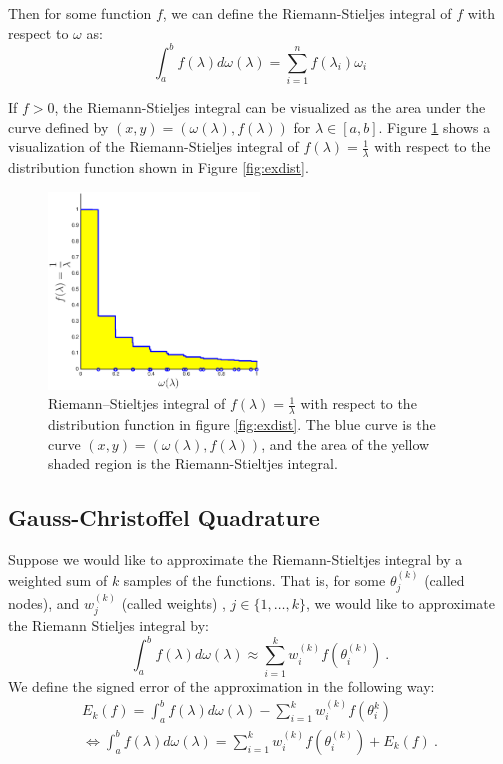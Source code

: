 \documentclass[10pt,a4paper]{article}
\begin{document}
Then for some function $f$, we can define the Riemann-Stieljes integral of $f$ with respect to $\omega$ as:
\begin{equation}
\int_a^b f(\lambda) d\omega(\lambda)  = \sum_{i=1}^n f \left( \lambda_i \right) \omega_i
\end{equation}

If $f > 0 $, the Riemann-Stieljes integral can be visualized as the area under the curve defined by $(x,y) = \left( \omega(\lambda) , f(\lambda) \right)$ for $\lambda \in \left[ a, b \right]$. Figure \ref{fig:exint} shows a visualization of the Riemann-Stieljes integral of $f(\lambda) = \frac{1}{\lambda}$ with respect to the distribution function shown in Figure \ref{fig:exdist}.

\begin{figure}[h]
  \centering
\includegraphics[width = 0.5\textwidth]{StInteg}
  \caption{Riemann–Stieltjes integral of $f(\lambda) = \frac{1}{\lambda}$ with respect to the distribution function in figure \ref{fig:exdist}. The blue curve is the curve $(x,y)=  (\omega(\lambda), f(\lambda))$, and the area of the yellow shaded region is the Riemann-Stieltjes integral. \label{fig:exint} }
\end{figure}




\subsection{Gauss-Christoffel Quadrature}

Suppose we would like to approximate the Riemann-Stieltjes integral by a weighted sum of $k$ samples of the functions. That is, for some $\theta_j^{(k)}$ (called nodes), and $w_j^{(k)}$ (called weights) , $j \in \{ 1, \dots, k \}$, we would like to approximate the Riemann Stieljes integral by:
\begin{equation}
\int_a^b f(\lambda) d\omega(\lambda) \approx \sum_{i=1}^{k} w_i^{(k)} f(\theta_i^{(k)}) \ . \nonumber
\end{equation}
We define the signed error of the approximation in the following way:
\begin{align}
E_k(f) =  \int_a^b f(\lambda) d\omega(\lambda)  -  \sum_{i=1}^{k} w_i^{(k)} f(\theta_i^k)  \nonumber \\
\iff \int_a^b f(\lambda) d\omega(\lambda)  =   \sum_{i=1}^{k} w_i^{(k)} f(\theta_i^{(k)})  + E_k(f) \nonumber \ .
\end{align}
\end{document}
